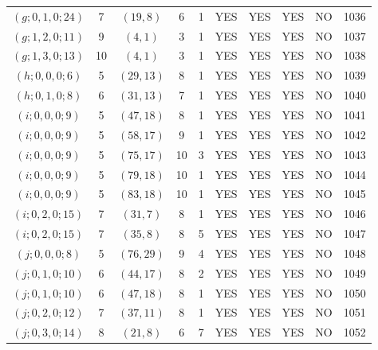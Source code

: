\begin{longtable}{|c|c|c|c|c|c|c|c|c|c|}
$(g; 0, 1, 0; 24)$ & 7 & $(19, 8)$ & 6 & 1 & YES & YES & YES & NO & 1036\\
$(g; 1, 2, 0; 11)$ & 9 & $(4, 1)$ & 3 & 1 & YES & YES & YES & NO & 1037\\
$(g; 1, 3, 0; 13)$ & 10 & $(4, 1)$ & 3 & 1 & YES & YES & YES & NO & 1038\\
$(h; 0, 0, 0; 6)$ & 5 & $(29, 13)$ & 8 & 1 & YES & YES & YES & NO & 1039\\
$(h; 0, 1, 0; 8)$ & 6 & $(31, 13)$ & 7 & 1 & YES & YES & YES & NO & 1040\\
$(i; 0, 0, 0; 9)$ & 5 & $(47, 18)$ & 8 & 1 & YES & YES & YES & NO & 1041\\
$(i; 0, 0, 0; 9)$ & 5 & $(58, 17)$ & 9 & 1 & YES & YES & YES & NO & 1042\\
$(i; 0, 0, 0; 9)$ & 5 & $(75, 17)$ & 10 & 3 & YES & YES & YES & NO & 1043\\
$(i; 0, 0, 0; 9)$ & 5 & $(79, 18)$ & 10 & 1 & YES & YES & YES & NO & 1044\\
$(i; 0, 0, 0; 9)$ & 5 & $(83, 18)$ & 10 & 1 & YES & YES & YES & NO & 1045\\
$(i; 0, 2, 0; 15)$ & 7 & $(31, 7)$ & 8 & 1 & YES & YES & YES & NO & 1046\\
$(i; 0, 2, 0; 15)$ & 7 & $(35, 8)$ & 8 & 5 & YES & YES & YES & NO & 1047\\
$(j; 0, 0, 0; 8)$ & 5 & $(76, 29)$ & 9 & 4 & YES & YES & YES & NO & 1048\\
$(j; 0, 1, 0; 10)$ & 6 & $(44, 17)$ & 8 & 2 & YES & YES & YES & NO & 1049\\
$(j; 0, 1, 0; 10)$ & 6 & $(47, 18)$ & 8 & 1 & YES & YES & YES & NO & 1050\\
$(j; 0, 2, 0; 12)$ & 7 & $(37, 11)$ & 8 & 1 & YES & YES & YES & NO & 1051\\
$(j; 0, 3, 0; 14)$ & 8 & $(21, 8)$ & 6 & 7 & YES & YES & YES & NO & 1052
\end{longtable}
